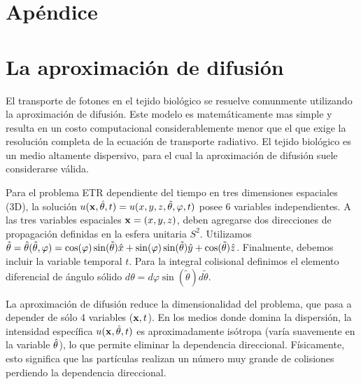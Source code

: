 \pagestyle{fancy}
\chapter*{Apéndice}
\lhead{\thepage}
\vspace{0.01\textheight}
\chapter{La aproximación de difusión}
\label{ap:ecdiff}

El transporte de fotones en el tejido biológico se resuelve 
comunmente utilizando la aproximación de difusión. 
Este modelo es matemáticamente mas simple y resulta en un 
costo computacional considerablemente menor que el que 
exige la resolución completa de la ecuación de transporte radiativo. 
El tejido biológico es un medio 
altamente dispersivo, para el cual la aproximación de 
difusión suele considerarse válida. 

Para el problema ETR dependiente del tiempo 
en tres dimensiones espaciales (3D), la solución $u(\mathbf{x},\hat{\theta},t)=u(x,y,z,\tilde{\theta},\varphi,t)$  
posee 6 variables independientes. A las tres variables espaciales $\mathbf{x}=(x,y,z)$, 
deben agregarse dos direcciones de propagación definidas en la esfera unitaria $S^2$. Utilizamos $\hat{\theta}=\hat{\theta}(\tilde{\theta},\varphi)=\cos(\varphi)\sin(\tilde{\theta})\hat x+\sin(\varphi)\sin(\tilde{\theta})\hat y+\cos(\tilde{\theta}) \hat z$. Finalmente, 
debemos incluir la variable temporal $t$. Para la integral colisional definimos el elemento diferencial de ángulo sólido  
$d\theta= d\varphi \sin(\tilde{\theta}) d\tilde{\theta}$. 

La aproximación 
de difusión reduce la dimensionalidad del problema, que pasa a depender de sólo 4 variables ($\mathbf{x},t$). 
En los medios donde domina la dispersión, la intensidad específica $u(\mathbf{x},\hat{\theta},t)$ es aproximadamente 
isótropa (varía suavemente en la variable $\hat{\theta}$), 
lo que permite eliminar la dependencia direccional. 
Físicamente, esto significa que las partículas realizan 
un número muy grande de colisiones perdiendo la dependencia 
direccional. 

